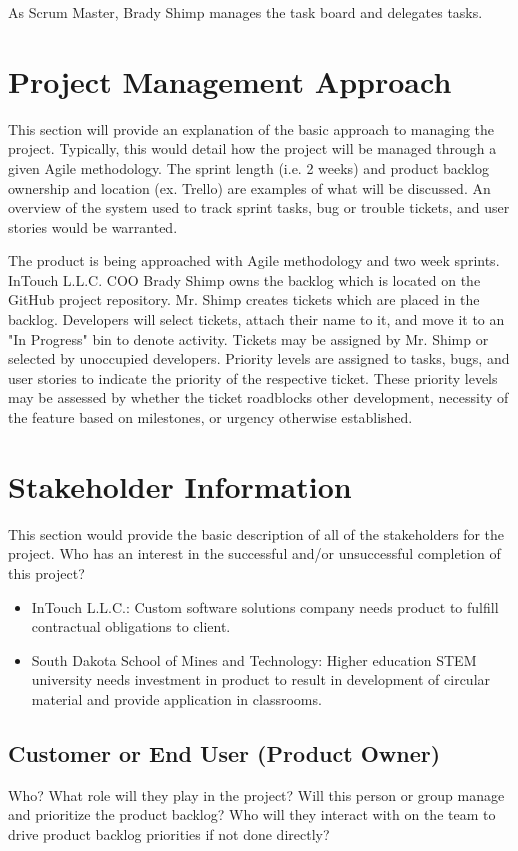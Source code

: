 As Scrum Master, Brady Shimp manages the task board and delegates tasks. 

\section{Project  Management Approach}
This section will provide an explanation of the basic approach to managing the 
project.  Typically, this would detail how the project will be managed through 
a given Agile methodology.  The sprint length (i.e. 2 weeks) and product backlog 
ownership and location (ex. Trello) are examples of what will be discussed.  An 
overview of the system used to track sprint tasks, bug or trouble tickets, and 
user stories would be warranted. 

The product is being approached with Agile methodology and two week sprints. InTouch L.L.C. COO Brady Shimp owns the backlog which is located on the GitHub project repository. Mr. Shimp creates tickets which are placed in the backlog. Developers will select tickets, attach their name to it, and move it to an "In Progress" bin to denote activity. Tickets may be assigned by Mr. Shimp or selected by unoccupied developers. Priority levels are assigned to tasks, bugs, and user stories to indicate the priority of the respective ticket. These priority levels may be assessed by whether the ticket roadblocks other development, necessity of the feature based on milestones, or urgency otherwise established.

\section{ Stakeholder Information}


This section would provide the basic description of all of the stakeholders for 
the project. Who has an interest in the successful and/or unsuccessful completion of this project? 

\begin{itemize}
	\item InTouch L.L.C.: Custom software solutions company needs product to fulfill contractual obligations to client. 
	\item South Dakota School of Mines and Technology: Higher education STEM university needs investment in product to result in development of circular material and provide application in classrooms.
\end{itemize}


\subsection{Customer or End User (Product Owner)}
Who?  What role will they play in the project?  Will this person or group manage 
and prioritize the product backlog?  Who will they interact with on the team to 
drive product backlog priorities if not done directly? 

